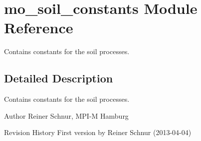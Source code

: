 \hypertarget{namespacemo__soil__constants}{}\section{mo\+\_\+soil\+\_\+constants Module Reference}
\label{namespacemo__soil__constants}


Contains constants for the soil processes.  




\subsection{Detailed Description}
Contains constants for the soil processes. 

\begin{DoxyAuthor}{Author}
Reiner Schnur, M\+P\+I-\/\+M Hamburg
\end{DoxyAuthor}
\begin{DoxyParagraph}{Revision History}
First version by Reiner Schnur (2013-\/04-\/04) 
\end{DoxyParagraph}
